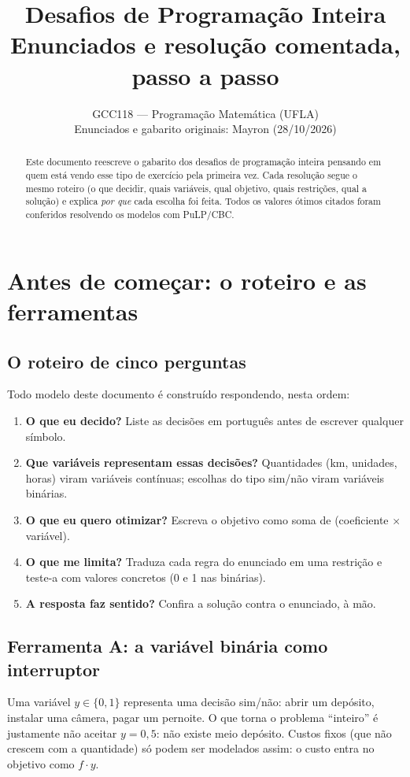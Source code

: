 \documentclass[11pt,a4paper]{article}
\title{\textbf{Desafios de Programação Inteira}\\[4pt]\large Enunciados e resolução comentada, passo a passo}
\author{GCC118 --- Programação Matemática (UFLA)\\[2pt]\small Enunciados e gabarito originais: Mayron (28/10/2026)}
\date{}
\begin{document}
\maketitle
\thispagestyle{empty}

\begin{abstract}
\noindent Este documento reescreve o gabarito dos desafios de programação inteira pensando em quem está
vendo esse tipo de exercício pela primeira vez. Cada resolução segue o mesmo roteiro (o que decidir,
quais variáveis, qual objetivo, quais restrições, qual a solução) e explica \emph{por que} cada escolha foi
feita. Todos os valores ótimos citados foram conferidos resolvendo os modelos com PuLP/CBC.
\end{abstract}

\tableofcontents

\clearpage
\section*{Antes de começar: o roteiro e as ferramentas}

\subsection*{O roteiro de cinco perguntas}
Todo modelo deste documento é construído respondendo, nesta ordem:
\begin{enumerate}
  \item \textbf{O que eu decido?} Liste as decisões em português antes de escrever qualquer símbolo.
  \item \textbf{Que variáveis representam essas decisões?} Quantidades (km, unidades, horas) viram
        variáveis contínuas; escolhas do tipo sim/não viram variáveis binárias.
  \item \textbf{O que eu quero otimizar?} Escreva o objetivo como soma de (coeficiente $\times$ variável).
  \item \textbf{O que me limita?} Traduza cada regra do enunciado em uma restrição e teste-a com
        valores concretos (0 e 1 nas binárias).
  \item \textbf{A resposta faz sentido?} Confira a solução contra o enunciado, à mão.
\end{enumerate}

\subsection*{Ferramenta A: a variável binária como interruptor}
Uma variável $y\in\{0,1\}$ representa uma decisão sim/não: abrir um depósito, instalar uma câmera,
pagar um pernoite. O que torna o problema ``inteiro'' é justamente não aceitar $y=0{,}5$: não existe meio
depósito. Custos fixos (que não crescem com a quantidade) só podem ser modelados assim: o custo entra no
objetivo como $f\cdot y$.
\end{document}
